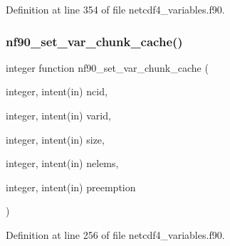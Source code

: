Definition at line 354 of file netcdf4\+\_\+variables.\+f90.

\mbox{\label{netcdf4__variables_8f90_a90ad028a51b07010140805455e456d31}} 
\subsubsection{\texorpdfstring{nf90\+\_\+set\+\_\+var\+\_\+chunk\+\_\+cache()}{nf90\_set\_var\_chunk\_cache()}}
{\footnotesize\ttfamily integer function nf90\+\_\+set\+\_\+var\+\_\+chunk\+\_\+cache (\begin{DoxyParamCaption}\item[{integer, intent(in)}]{ncid,  }\item[{integer, intent(in)}]{varid,  }\item[{integer, intent(in)}]{size,  }\item[{integer, intent(in)}]{nelems,  }\item[{integer, intent(in)}]{preemption }\end{DoxyParamCaption})}



Definition at line 256 of file netcdf4\+\_\+variables.\+f90.

